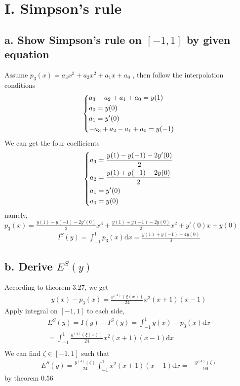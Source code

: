 \documentclass[twoside,a4paper]{article}
\newcommand{\dif}{\mathrm{d}}
\begin{document}
\pagestyle{fancy}
\fancyhead{}


\section*{I. Simpson's rule}

\subsection*{a. Show Simpson's rule on $[-1,1]$ by given equation} 
Assume $p_3(x)=a_3x^3+a_2x^2+a_1x+a_0$ , then follow the interpolation conditions
\[ \left \{ \begin{lgathered}
a_3+a_2+a_1+a_0=y(1) \\
a_0=y(0) \\
a_1=y'(0) \\
-a_3+a_2-a_1+a_0=y(-1)
\end{lgathered} \right. \]
We can get the four coefficients
\[ \left \{ \begin{lgathered}
a_3=\frac{y(1)-y(-1)-2y'(0)}{2} \\
a_2=\frac{y(1)+y(-1)-2y(0)}{2} \\
a_1=y'(0) \\
a_0=y(0)
\end{lgathered} \right. \]
namely, $p_3(x)=\frac{y(1)-y(-1)-2y'(0)}{2}x^3+\frac{y(1)+y(-1)-2y(0)}{2}x^2+y'(0)x+y(0)$
\begin{gather}
I^{S}(y)=\int_{-1}^{1}p_3(x) \dif x=\frac{y(1)+y(-1)+4y(0)}{3}
\end{gather}
\subsection*{b. Derive $E^S(y)$}
According to theorem 3.27, we get
\begin{gather}
y(x)-p_3(x)=\frac{y^{(4)}(\xi(x))}{24}x^2(x+1)(x-1)
\end{gather}
Apply integral on $[-1,1]$ to each side,
\begin{gather}
E^S(y)=I(y)-I^S(y)=\int_{-1}^{1}y(x)-p_3(x) \dif x\\
=\int_{-1}^1 \frac{y^{(4)}(\xi(x))}{24}x^2(x+1)(x-1) \dif x \\
\end{gather}
We can find $\zeta \in [-1,1]$ such that 
\begin{gather}
E^S(y)=\frac{y^{(4)}(\zeta)}{24} \int_{-1}^1 x^2(x+1)(x-1) \dif x =- \frac{y^{(4)}(\zeta)}{90}
\end{gather}
by theorem 0.56
\end{document}
